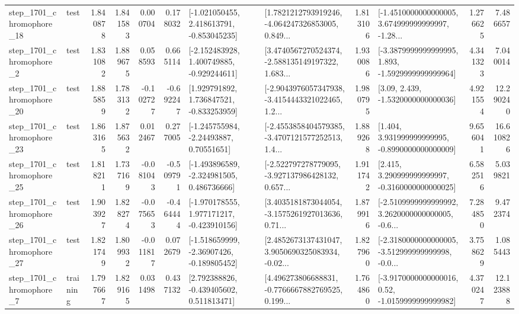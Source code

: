 \begin{tabular}{llrrrrllrlrr}
 step\_1701\_chromophore\_18 &      test &      1.840878 &    1.841583 &      0.000704 &  0.178032 &   [-1.021050455, 2.418613791, -0.853045235] &  [1.7821212793919246, -4.064247326853005, 0.849... &       1.813106 &  [-1.4510000000000005, 3.674999999999997, -1.28... &            1.276625 &          7.486657 \\
  step\_1701\_chromophore\_2 &      test &      1.831082 &    1.889675 &      0.058593 &  0.665114 &   [-2.152483928, 1.400749885, -0.929244611] &  [3.4740567270524374, -2.588135149197322, 1.683... &       1.930086 &  [-3.3879999999999995, 1.893, -1.5929999999999964] &            4.341323 &          7.040014 \\
 step\_1701\_chromophore\_20 &      test &      1.885859 &    1.783132 &     -0.102727 & -0.692247 &    [1.929791892, 1.736847521, -0.833253959] &  [-2.9043976057347938, -3.4154443321022465, 1.2... &       1.980795 &                 [3.09, 2.439, -1.5320000000000036] &            4.921554 &         12.290240 \\
 step\_1701\_chromophore\_23 &      test &      1.863165 &    1.875632 &      0.012467 &  0.277005 &     [-1.245755984, -2.24493887, 0.70551651] &  [-2.4553858404579385, -3.4707121577252513, 1.4... &       1.889268 &    [1.404, 3.931999999999995, -0.8990000000000009] &            9.656041 &         16.610826 \\
 step\_1701\_chromophore\_25 &      test &      1.818211 &    1.737169 &     -0.081043 & -0.509791 &   [-1.493896589, -2.324981505, 0.486736666] &  [-2.522797278779095, -3.927137986428132, 0.657... &       1.911742 &    [2.415, 3.290999999999997, -0.3160000000000025] &            6.582516 &          5.039821 \\
 step\_1701\_chromophore\_26 &      test &      1.903927 &    1.828274 &     -0.075653 & -0.464444 &   [-1.970178555, 1.977171217, -0.423910156] &  [3.4035181873044054, -3.1575261927013636, 0.71... &       1.879916 &  [-2.5109999999999992, 3.2620000000000005, -0.6... &            7.284850 &          9.472374 \\
 step\_1701\_chromophore\_27 &      test &      1.821749 &    1.809932 &     -0.011817 &  0.072679 &   [-1.518659999, -2.36907426, -0.189805452] &  [2.4852673137431047, 3.9050690325083934, -0.02... &       1.827960 &  [-2.3180000000000005, -3.512999999999998, -0.0... &            3.758629 &          1.085443 \\
  step\_1701\_chromophore\_7 &  training &      1.797667 &    1.829165 &      0.031498 &  0.437132 &    [2.792388826, -0.439405602, 0.511813471] &  [4.496273806688831, -0.7766667882769525, 0.199... &       1.764860 &   [-3.9170000000000016, 0.52, -1.0159999999999982] &            4.370247 &         12.123888 \\

\end{tabular}
